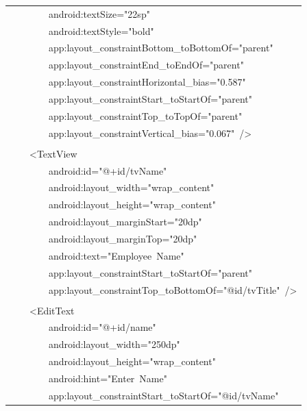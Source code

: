 \documentclass[a4paper,12pt]{article}
\begin{document}
\begin{longtable}{|p{}|}
{\ttfamily\small \ \ \ \ \ \ \ \ android:textSize="22sp"} \\
{\ttfamily\small \ \ \ \ \ \ \ \ android:textStyle="bold"} \\
{\ttfamily\small \ \ \ \ \ \ \ \ app:layout\_constraintBottom\_toBottomOf="parent"} \\
{\ttfamily\small \ \ \ \ \ \ \ \ app:layout\_constraintEnd\_toEndOf="parent"} \\
{\ttfamily\small \ \ \ \ \ \ \ \ app:layout\_constraintHorizontal\_bias="0.587"} \\
{\ttfamily\small \ \ \ \ \ \ \ \ app:layout\_constraintStart\_toStartOf="parent"} \\
{\ttfamily\small \ \ \ \ \ \ \ \ app:layout\_constraintTop\_toTopOf="parent"} \\
{\ttfamily\small \ \ \ \ \ \ \ \ app:layout\_constraintVertical\_bias="0.067"\ /\textgreater{}} \\
\strut \\
{\ttfamily\small \ \ \ \ \textless{}TextView} \\
{\ttfamily\small \ \ \ \ \ \ \ \ android:id="@+id/tvName"} \\
{\ttfamily\small \ \ \ \ \ \ \ \ android:layout\_width="wrap\_content"} \\
{\ttfamily\small \ \ \ \ \ \ \ \ android:layout\_height="wrap\_content"} \\
{\ttfamily\small \ \ \ \ \ \ \ \ android:layout\_marginStart="20dp"} \\
{\ttfamily\small \ \ \ \ \ \ \ \ android:layout\_marginTop="20dp"} \\
{\ttfamily\small \ \ \ \ \ \ \ \ android:text="Employee\ Name"} \\
{\ttfamily\small \ \ \ \ \ \ \ \ app:layout\_constraintStart\_toStartOf="parent"} \\
{\ttfamily\small \ \ \ \ \ \ \ \ app:layout\_constraintTop\_toBottomOf="@id/tvTitle"\ /\textgreater{}} \\
\strut \\
{\ttfamily\small \ \ \ \ \textless{}EditText} \\
{\ttfamily\small \ \ \ \ \ \ \ \ android:id="@+id/name"} \\
{\ttfamily\small \ \ \ \ \ \ \ \ android:layout\_width="250dp"} \\
{\ttfamily\small \ \ \ \ \ \ \ \ android:layout\_height="wrap\_content"} \\
{\ttfamily\small \ \ \ \ \ \ \ \ android:hint="Enter\ Name"} \\
{\ttfamily\small \ \ \ \ \ \ \ \ app:layout\_constraintStart\_toStartOf="@id/tvName"} \\

\end{longtable}
\end{document}
